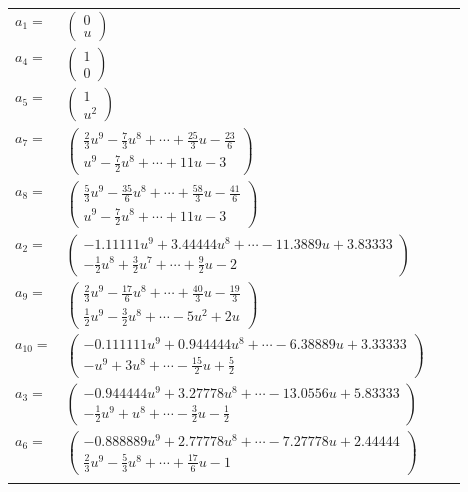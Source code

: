\documentclass[1p]{elsarticle_modified}
\theoremstyle{definition}
\begin{document}
\begin{tabular}{m{7pt} m{180pt} m{7pt} m{180pt} }
\flushright $a_{1}=$&$\begin{pmatrix}0\\u\end{pmatrix}$ \\
\flushright $a_{4}=$&$\begin{pmatrix}1\\0\end{pmatrix}$ \\
\flushright $a_{5}=$&$\begin{pmatrix}1\\u^2\end{pmatrix}$ \\
\flushright $a_{7}=$&$\begin{pmatrix}\frac{2}{3} u^9-\frac{7}{3} u^8+\cdots+\frac{25}{3} u-\frac{23}{6}\\u^9-\frac{7}{2} u^8+\cdots+11 u-3\end{pmatrix}$ \\
\flushright $a_{8}=$&$\begin{pmatrix}\frac{5}{3} u^9-\frac{35}{6} u^8+\cdots+\frac{58}{3} u-\frac{41}{6}\\u^9-\frac{7}{2} u^8+\cdots+11 u-3\end{pmatrix}$ \\
\flushright $a_{2}=$&$\begin{pmatrix}-1.11111 u^{9}+3.44444 u^{8}+\cdots-11.3889 u+3.83333\\-\frac{1}{2} u^8+\frac{3}{2} u^7+\cdots+\frac{9}{2} u-2\end{pmatrix}$ \\
\flushright $a_{9}=$&$\begin{pmatrix}\frac{2}{3} u^9-\frac{17}{6} u^8+\cdots+\frac{40}{3} u-\frac{19}{3}\\\frac{1}{2} u^9-\frac{3}{2} u^8+\cdots-5 u^2+2 u\end{pmatrix}$ \\
\flushright $a_{10}=$&$\begin{pmatrix}-0.111111 u^{9}+0.944444 u^{8}+\cdots-6.38889 u+3.33333\\- u^9+3 u^8+\cdots-\frac{15}{2} u+\frac{5}{2}\end{pmatrix}$ \\
\flushright $a_{3}=$&$\begin{pmatrix}-0.944444 u^{9}+3.27778 u^{8}+\cdots-13.0556 u+5.83333\\-\frac{1}{2} u^9+u^8+\cdots-\frac{3}{2} u-\frac{1}{2}\end{pmatrix}$ \\
\flushright $a_{6}=$&$\begin{pmatrix}-0.888889 u^{9}+2.77778 u^{8}+\cdots-7.27778 u+2.44444\\\frac{2}{3} u^9-\frac{5}{3} u^8+\cdots+\frac{17}{6} u-1\end{pmatrix}$\\&\end{tabular}
\end{document}
